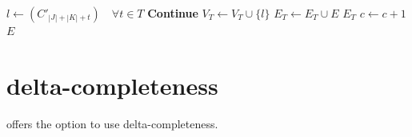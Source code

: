 \documentclass[runningheads]{llncs}
\begin{document}
\begin{algorithm}
\begin{algorithmic}
        \State $l \gets (C'_{|J| + |K| + t}) \quad \forall t \in T$ %
         
        \State \textbf{Continue}
        \EndIf
        \State $V_T \gets V_T \cup \{l\}$
        \State $E_T \gets E_T \cup E$
         
        \State \Return $E_T$
        \EndIf
        \State $c \gets c + 1$
        \EndWhile
        \State \Return $E$
    \end{algorithmic}
\end{algorithm}

\section{delta-completeness}
\label{sec:delta-completeness}

\dlinear offers the option to use delta-completeness.
\end{document}

